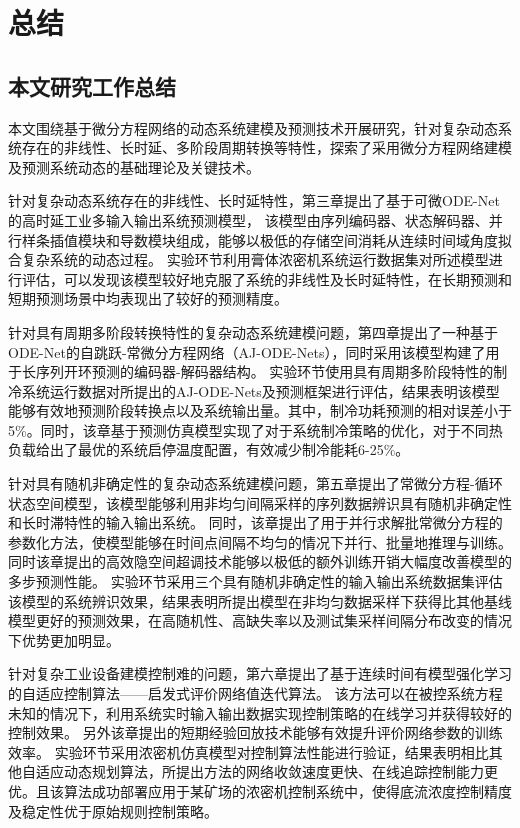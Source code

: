 \chapter{总结}
\section{本文研究工作总结}
本文围绕基于微分方程网络的动态系统建模及预测技术开展研究，针对复杂动态系统存在的非线性、长时延、多阶段周期转换等特性，探索了采用微分方程网络建模及预测系统动态的基础理论及关键技术。

针对复杂动态系统存在的非线性、长时延特性，第三章提出了基于可微ODE-Net的高时延工业多输入输出系统预测模型，
该模型由序列编码器、状态解码器、并行样条插值模块和导数模块组成，能够以极低的存储空间消耗从连续时间域角度拟合复杂系统的动态过程。
实验环节利用膏体浓密机系统运行数据集对所述模型进行评估，可以发现该模型较好地克服了系统的非线性及长时延特性，在长期预测和短期预测场景中均表现出了较好的预测精度。

针对具有周期多阶段转换特性的复杂动态系统建模问题，第四章提出了一种基于ODE-Net的自跳跃-常微分方程网络（AJ-ODE-Nets），同时采用该模型构建了用于长序列开环预测的编码器-解码器结构。
实验环节使用具有周期多阶段特性的制冷系统运行数据对所提出的AJ-ODE-Nets及预测框架进行评估，结果表明该模型能够有效地预测阶段转换点以及系统输出量。其中，制冷功耗预测的相对误差小于5\%。同时，该章基于预测仿真模型实现了对于系统制冷策略的优化，对于不同热负载给出了最优的系统启停温度配置，有效减少制冷能耗6-25\%。

针对具有随机非确定性的复杂动态系统建模问题，第五章提出了常微分方程-循环状态空间模型，该模型能够利用非均匀间隔采样的序列数据辨识具有随机非确定性和长时滞特性的输入输出系统。
同时，该章提出了用于并行求解批常微分方程的参数化方法，使模型能够在时间点间隔不均匀的情况下并行、批量地推理与训练。同时该章提出的高效隐空间超调技术能够以极低的额外训练开销大幅度改善模型的多步预测性能。
实验环节采用三个具有随机非确定性的输入输出系统数据集评估该模型的系统辨识效果，结果表明所提出模型在非均匀数据采样下获得比其他基线模型更好的预测效果，在高随机性、高缺失率以及测试集采样间隔分布改变的情况下优势更加明显。

针对复杂工业设备建模控制难的问题，第六章提出了基于连续时间有模型强化学习的自适应控制算法——启发式评价网络值迭代算法。
该方法可以在被控系统方程未知的情况下，利用系统实时输入输出数据实现控制策略的在线学习并获得较好的控制效果。
另外该章提出的短期经验回放技术能够有效提升评价网络参数的训练效率。
实验环节采用浓密机仿真模型对控制算法性能进行验证，结果表明相比其他自适应动态规划算法，所提出方法的网络收敛速度更快、在线追踪控制能力更优。且该算法成功部署应用于某矿场的浓密机控制系统中，使得底流浓度控制精度及稳定性优于原始规则控制策略。


